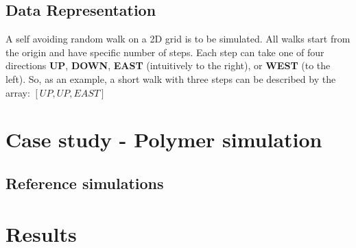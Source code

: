 \documentclass[11pt]{article}
\begin{document}
\subsection{Data Representation}
A self avoiding random walk on a 2D grid is to be simulated. All walks start from the origin and have specific number of steps. Each step can take one of four directions \textbf{UP}, \textbf{DOWN}, \textbf{EAST} (intuitively to the right),  or \textbf{WEST} (to the left). So, as an example, a short walk with three steps can be described by the array:
\begin{math}
  \left[ UP, UP, EAST \right]
\end{math}

\section{Case study - Polymer simulation}
\subsection{Reference simulations}


\section{Results}


\end{document}
